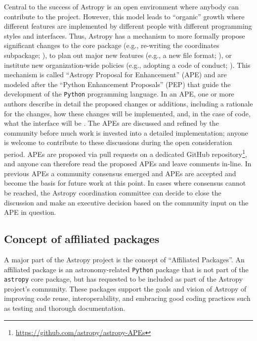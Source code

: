 \documentclass[modern]{aastex61}
\newcommand{\package}[1]{\texttt{#1}\xspace}
\newcommand{\python}{\package{Python}}
\newcommand{\astropy}{Astropy\xspace}
\newcommand{\astropypkg}{\package{astropy}}
\begin{document}
Central to the success of \astropy is an open environment where anybody can
contribute to the project.
However, this model leads to ``organic'' growth where different features are
implemented by different people with different programming styles and
interfaces.
Thus, \astropy has a mechanism to more formally propose significant changes to
the core package (e.g., re-writing the coordinates subpackage; \citealt{ape5}),
to plan out major new features (e.g., a new file format; \citealt{ape6}), or
institute new organization-wide policies (e.g., adopting a code of conduct;
\citealt{ape8}).
This mechanism is called ``Astropy Proposal for Enhancement'' (APE) and are
modeled after the ``Python Enhancement Proposals'' (PEP) that guide the
development of the \python programming language.
In an APE, one or more authors describe in detail the proposed changes or
additions, including a rationale for the changes, how these changes will be
implemented, and, in the case of code, what the interface will be \citep{ape1}.
The APEs are discussed and refined by the community before much work is invested
into a detailed implementation; anyone is welcome to contribute to these
discussions during the open consideration period. APEs are proposed via pull
requests on a dedicated GitHub repository\footnote{\url{https://github.com/astropy/astropy-APEs}},
and anyone can therefore read the proposed APEs and leave comments in-line.
In previous APEs a community consensus emerged and APEs are accepted and become
the basis for future work at this point.
In cases where consensus cannot be reached, the
\astropy coordination committee can decide to close the discussion and
make an executive decision based on the community input on the APE in question.


\subsection{Concept of affiliated packages}

A major part of the \astropy project is the concept of
``Affiliated Packages''. An affiliated package is an astronomy-related
\python package that is not part of the \astropypkg core package, but
has requested to be included as part of the \astropy project's
community. These packages support the goals and vision of \astropy of
improving code reuse, interoperability, and embracing good coding
practices such as testing and thorough documentation.
\end{document}
